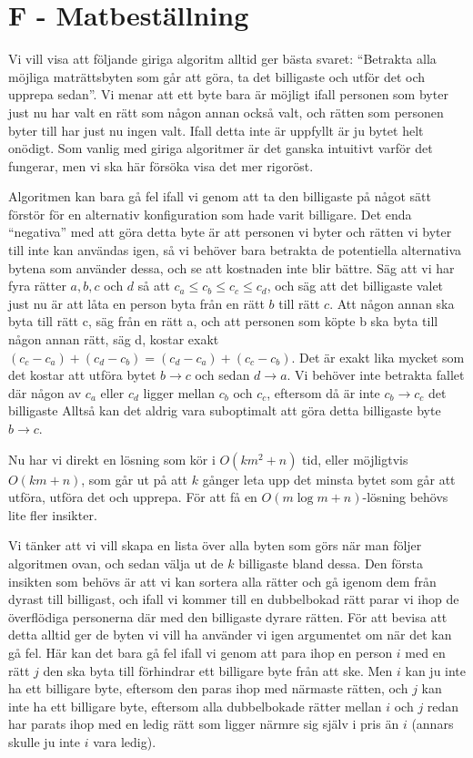 \section*{F - Matbeställning}

Vi vill visa att följande giriga algoritm alltid ger bästa svaret: ``Betrakta alla möjliga maträttsbyten som går att göra, ta det billigaste och utför det och upprepa sedan''.
Vi menar att ett byte bara är möjligt ifall personen som byter just nu har valt en rätt som någon annan också valt, och rätten som personen byter till har just nu ingen valt.
Ifall detta inte är uppfyllt är ju bytet helt onödigt. Som vanlig med giriga algoritmer är det ganska intuitivt varför det fungerar, men vi ska här försöka visa det mer rigoröst.

Algoritmen kan bara gå fel ifall vi genom att ta den billigaste på något sätt förstör för en alternativ konfiguration som hade varit billigare. Det enda ``negativa'' med att göra detta byte är att personen vi byter och rätten vi byter till inte kan användas igen, så vi behöver bara betrakta de potentiella alternativa bytena som använder dessa, och se att kostnaden inte blir bättre. Säg att vi har fyra rätter $a, b, c$ och $d$ så att $c_a \le c_b \le c_c \le c_d$, och säg att det billigaste valet just nu är att låta en person byta från en rätt $b$ till rätt $c$. Att någon annan ska byta till rätt c, säg från en rätt a, och att personen som köpte b ska byta till någon annan rätt, säg d, kostar exakt $(c_c-c_a)+(c_d-c_b) = (c_d-c_a)+(c_c-c_b)$. Det är exakt lika mycket som det kostar att utföra bytet $b \rightarrow c$ och sedan $d \rightarrow a$. Vi behöver inte betrakta fallet där någon av $c_a$ eller $c_d$ ligger mellan $c_b$ och $c_c$, eftersom då är inte $c_b \rightarrow c_c$ det billigaste  Alltså kan det aldrig vara suboptimalt att göra detta billigaste byte $b \rightarrow c$.

Nu har vi direkt en lösning som kör i $O(km^2 + n)$ tid, eller möjligtvis $O(km + n)$, som går ut på att $k$ gånger leta upp det minsta bytet som går att utföra, utföra det och upprepa. För att få en $O(m \log m + n)$-lösning behövs lite fler insikter.

Vi tänker att vi vill skapa en lista över alla byten som görs när man följer algoritmen ovan, och sedan välja ut de $k$ billigaste bland dessa. Den första insikten som behövs är att vi kan sortera alla rätter och gå igenom dem från dyrast till billigast, och ifall vi kommer till en dubbelbokad rätt parar vi ihop de överflödiga personerna där med den billigaste dyrare rätten. För att bevisa att detta alltid ger de byten vi vill ha använder vi igen argumentet om när det kan gå fel. Här kan det bara gå fel ifall vi genom att para ihop en person $i$ med en rätt $j$ den ska byta till förhindrar ett billigare byte från att ske. Men $i$ kan ju inte ha ett billigare byte, eftersom den paras ihop med närmaste rätten, och $j$ kan inte ha ett billigare byte, eftersom alla dubbelbokade rätter mellan $i$ och $j$ redan har parats ihop med en ledig rätt som ligger närmre sig själv i pris än $i$ (annars skulle ju inte $i$ vara ledig). 

